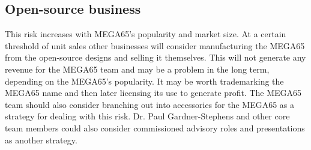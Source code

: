 \subsection{Open-source business}
This risk increases with MEGA65's popularity and market size. At a certain threshold of unit sales other businesses will consider manufacturing the MEGA65 from the open-source designs and selling it themselves. This will not generate any revenue for the MEGA65 team and may be a problem in the long term, depending on the MEGA65's popularity. It may be worth trademarking the MEGA65 name and then later licensing its use to generate profit. The MEGA65 team should also consider branching out into accessories for the MEGA65 as a strategy for dealing with this risk. Dr. Paul Gardner-Stephens and other core team members could also consider commissioned advisory roles and presentations as another strategy. 

